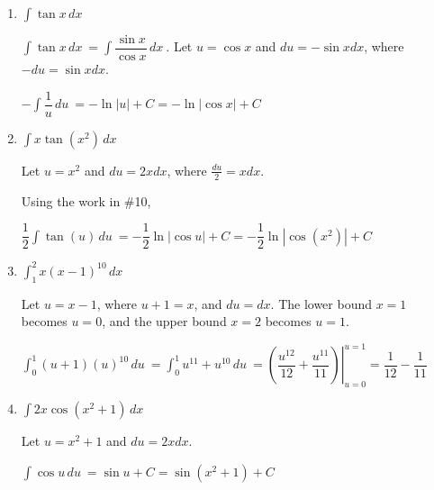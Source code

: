 \documentclass{article}
\begin{document}
\begin{enumerate}
\begin{solution}
    Let $u=x^4+4x$ and $du=(4x^3+4)dx$, where $\dfrac{du}{4}=(x^3+1)dx$.

 $\displaystyle \dfrac{1}{4} \int \sqrt[3]{u}\,du\ = \displaystyle \dfrac{1}{4} \int u^{1/3}\,du\ = \dfrac{1}{4}\cdot\dfrac{u^{4/3}}{4/3}+C=\dfrac{3}{16}(x^4+4x)^{4/3}+C$   
\end{solution}
\pspace{\vfill}
\pspace{\newpage}
\item $\displaystyle \int \tan x\,dx\ $

\begin{solution}
   $\displaystyle \int \tan x\,dx\ = \displaystyle \int \dfrac{\sin x}{\cos x} \,dx\ $. Let $u=\cos x$ and $du=-\sin xdx$, where $-du=\sin xdx$. 

$\displaystyle -\int \dfrac{1}{u} \,du\ = -\ln|u|+C=-\ln|\cos x|+C$
   
\end{solution}

\pspace{\vfill}
\item $\displaystyle \int x\tan\left(x^2\right)\,dx\ $

\begin{solution}
  Let $u=x^2$ and $du=2xdx$, where $\frac{du}{2}=xdx$.

  Using the work in \#10, 

  $\displaystyle \dfrac{1}{2}\int \tan\left(u\right)\,du\ =-\dfrac{1}{2}\ln|\cos u|+C = -\dfrac{1}{2}\ln|\cos (x^2)|+C$
\end{solution}
\pspace{\vfill}

\item $\displaystyle \int_{1}^{2} x(x-1)^{10}\,dx\ $

\begin{solution}
    Let $u=x-1$, where $u+1=x$, and $du=dx$. The lower bound $x=1$ becomes $u=0$, and the upper bound $x=2$ becomes $u=1$.

    $\displaystyle \int_{0}^{1} (u+1)(u)^{10}\,du\ = \displaystyle \int_{0}^{1} u^{11}+u^{10}\,du\ = \displaystyle \left. \left(\dfrac{u^{12}}{12}+\dfrac{u^{11}}{11}\right) \right|_{u=0}^{u=1}=\dfrac{1}{12}-\dfrac{1}{11}$
\end{solution}
\pspace{\vfill}

\item $\displaystyle \int 2x \cos (x^2+1)\,dx\ $

\begin{solution}
    Let $u=x^2+1$ and $du=2xdx$.

    $\displaystyle \int \cos u\,du\ = \sin u +C = \sin(x^2+1)+C$
\end{solution}
\pspace{\vfill}
\pspace{\newpage}



\end{enumerate}
\end{document}
